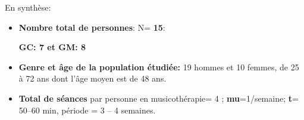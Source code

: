 

















En synthèse:
 \begin{itemize}

 \item \textbf{Nombre total de personnes}: N=  \textbf{15}:


 \textbf{GC: 7 et GM: 8}
\item\textbf{Genre et âge de la population étudiée:}  19 hommes et 10 femmes, de 25 à 72
  ans dont l'âge moyen est de 48 ans.
 
 \item \textbf{Total de séances} par personne en
   musicothérapie= 4 ;   \textbf{mu}=1/semaine;
 \textbf{t}= 50--60 min, période = 3 -- 4 semaines.
\end{itemize}




